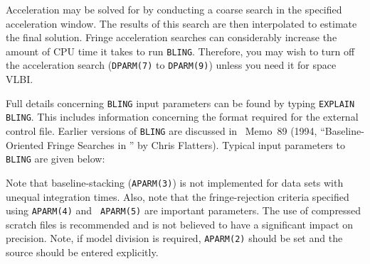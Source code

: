 Acceleration may be solved for by conducting a coarse search in the
specified acceleration window. The results of this search are then
interpolated to estimate the final solution. Fringe acceleration
searches can considerably increase the amount of CPU time it takes to
run {\tt BLING}\@.  Therefore, you may wish to turn off the
acceleration search ({\tt DPARM(7)} to {\tt DPARM(9)}) unless you need
it for space VLBI\@.

Full details concerning {\tt BLING} input parameters can be found by
typing {\tt EXPLAIN BLING}\@.  This includes information concerning
the format required for the external control file.  Earlier versions
of {\tt BLING} are discussed in \AIPS\ Memo~89 (1994,
``Baseline-Oriented Fringe Searches in \AIPS'' by Chris Flatters).
Typical input parameters to {\tt BLING} are given below:
\pd

Note that baseline-stacking ({\tt APARM(3)}) is not implemented for
data sets with unequal integration times. Also, note that the
fringe-rejection criteria specified using {\tt APARM(4)} and {\tt
APARM(5)} are important parameters.  The use of compressed scratch
files is recommended and is not believed to have a significant impact
on precision. Note, if model division is required, {\tt APARM(2)}
should be set and the source should be entered explicitly.

